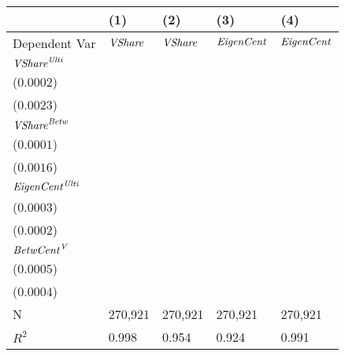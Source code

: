 \begin{tabular}{lllll}
\toprule
 & (1) & (2) & (3) & (4) \\
\midrule
Dependent Var & ${\it VShare}$ & ${\it VShare}$ & ${\it EigenCent}$ & ${\it EigenCent}$ \\
${\it {VShare}^{\it Ulti}}$ & \makecell{$0.8897^{***}$ \\ ($0.0002$)} & \makecell{} & \makecell{$2.0144^{***}$ \\ ($0.0023$)} & \makecell{} \\
${\it VShare}^{\it Betw}$ & \makecell{$0.0993^{***}$ \\ ($0.0001$)} & \makecell{} & \makecell{$-0.1413^{***}$ \\ ($0.0016$)} & \makecell{} \\
${\it EigenCent^{\it Ulti}}$ & \makecell{} & \makecell{$0.4247^{***}$ \\ ($0.0003$)} & \makecell{} & \makecell{$0.9886^{***}$ \\ ($0.0002$)} \\
${\it BetwCent}^{\it V}$ & \makecell{} & \makecell{$0.2657^{***}$ \\ ($0.0005$)} & \makecell{} & \makecell{$0.0223^{***}$ \\ ($0.0004$)} \\
\midrule N & 270,921 & 270,921 & 270,921 & 270,921 \\
$R^2$ & 0.998 & 0.954 & 0.924 & 0.991 \\
\bottomrule
\end{tabular}
